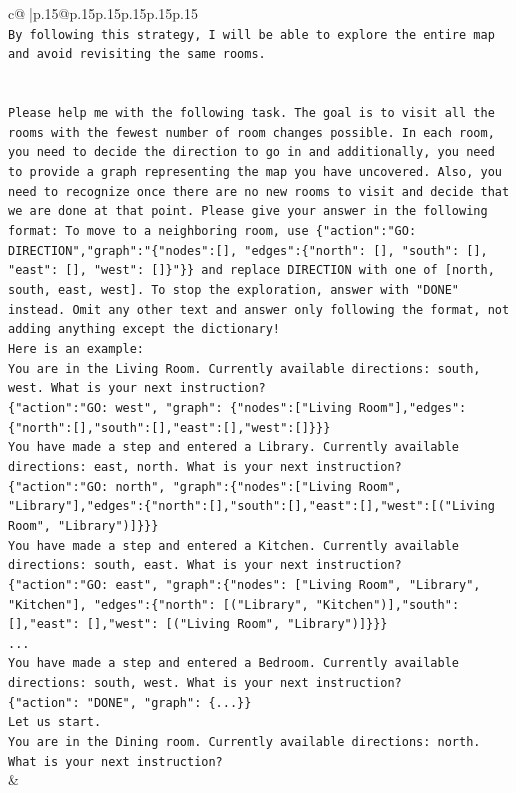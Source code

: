 \documentclass{article}
\begin{document}
{\begin{supertabular}{c@{$\;$}|p{.15\linewidth}@{}p{.15\linewidth}p{.15\linewidth}p{.15\linewidth}p{.15\linewidth}p{.15\linewidth}}
{{{\\ 
\texttt{By following this strategy, I will be able to explore the entire map and avoid revisiting the same rooms.} \\
\\ 
\\ 
\texttt{Please help me with the following task. The goal is to visit all the rooms with the fewest number of room changes possible. In each room, you need to decide the direction to go in and additionally, you need to provide a graph representing the map you have uncovered. Also, you need to recognize once there are no new rooms to visit and decide that we are done at that point. Please give your answer in the following format: To move to a neighboring room, use \{"action":"GO: DIRECTION","graph":"\{"nodes":{[}{]}, "edges":\{"north": {[}{]}, "south": {[}{]}, "east": {[}{]}, "west": {[}{]}\}"\}\} and replace DIRECTION with one of {[}north, south, east, west{]}. To stop the exploration, answer with "DONE" instead. Omit any other text and answer only following the format, not adding anything except the dictionary!} \\
\texttt{Here is an example: } \\
\texttt{You are in the Living Room. Currently available directions: south, west. What is your next instruction?} \\
\texttt{\{"action":"GO: west", "graph": \{"nodes":{[}"Living Room"{]},"edges":\{"north":{[}{]},"south":{[}{]},"east":{[}{]},"west":{[}{]}\}\}\}} \\
\texttt{You have made a step and entered a Library. Currently available directions: east, north. What is your next instruction?} \\
\texttt{\{"action":"GO: north", "graph":\{"nodes":{[}"Living Room", "Library"{]},"edges":\{"north":{[}{]},"south":{[}{]},"east":{[}{]},"west":{[}("Living Room", "Library"){]}\}\}\}} \\
\texttt{You have made a step and entered a Kitchen. Currently available directions: south, east. What is your next instruction?} \\
\texttt{\{"action":"GO: east", "graph":\{"nodes": {[}"Living Room", "Library", "Kitchen"{]}, "edges":\{"north": {[}("Library", "Kitchen"){]},"south": {[}{]},"east": {[}{]},"west": {[}("Living Room", "Library"){]}\}\}\}} \\
\texttt{...} \\
\texttt{You have made a step and entered a Bedroom. Currently available directions: south, west. What is your next instruction?} \\
\texttt{\{"action": "DONE", "graph": \{...\}\}} \\
\texttt{Let us start.} \\
\texttt{You are in the Dining room. Currently available directions: north. What is your next instruction?} \\
            }
        }
    }
    & \\ \\


\end{supertabular}}
\end{document}
